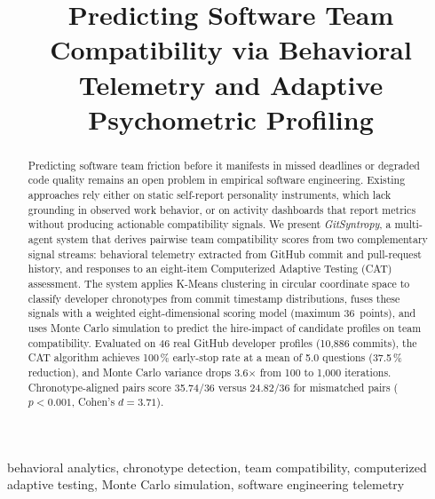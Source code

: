 \documentclass[conference]{IEEEtran}
\begin{document}
\title{Predicting Software Team Compatibility via Behavioral
Telemetry and Adaptive Psychometric Profiling}

\author{
}

\maketitle

\begin{abstract}
Predicting software team friction before it manifests in missed
deadlines or degraded code quality remains an open problem in
empirical software engineering.  Existing approaches rely either on
static self-report personality instruments, which lack grounding in
observed work behavior, or on activity dashboards that report metrics
without producing actionable compatibility signals.  We present
\textit{GitSyntropy}, a multi-agent system that derives pairwise team
compatibility scores from two complementary signal streams: behavioral
telemetry extracted from GitHub commit and pull-request history, and
responses to an eight-item Computerized Adaptive Testing (CAT)
assessment.  The system applies K-Means clustering in circular
coordinate space to classify developer chronotypes from commit
timestamp distributions, fuses these signals with a weighted
eight-dimensional scoring model (maximum 36~points), and uses Monte
Carlo simulation to predict the hire-impact of candidate profiles on
team compatibility.  Evaluated on 46 real GitHub developer profiles
(10,886 commits), the CAT algorithm achieves 100\,\% early-stop rate
at a mean of 5.0 questions (37.5\,\% reduction), and Monte Carlo
variance drops 3.6$\times$ from 100 to 1,000 iterations.
Chronotype-aligned pairs score 35.74/36 versus 24.82/36 for
mismatched pairs ($p < 0.001$, Cohen's $d = 3.71$).
\end{abstract}

\begin{IEEEkeywords}
behavioral analytics, chronotype detection, team compatibility,
computerized adaptive testing, Monte Carlo simulation,
software engineering telemetry
\end{IEEEkeywords}
\end{document}
